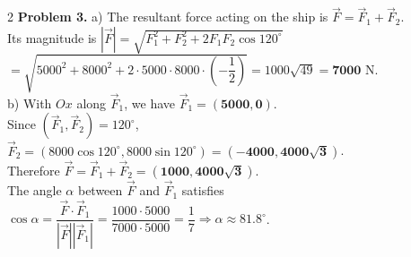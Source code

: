 \documentclass[10pt,a4paper]{article}
\begin{document}
\begin{multicols}{2}
\textbf{Problem 3.}
a) The resultant force acting on the ship is $\vec{F} = \vec{F}_1 + \vec{F}_2$.\\
Its magnitude is $|\vec{F}| = \sqrt{F_1^2 + F_2^2 + 2F_1 F_2 \cos 120^\circ}$\\
$= \sqrt{5000^2 + 8000^2 + 2\cdot 5000\cdot 8000\cdot \left(-\dfrac{1}{2}\right)} = 1000\sqrt{49} = \mathbf{7000}\text{ N}$.\\
b) With $Ox$ along $\vec{F}_1$, we have $\vec{F}_1 = (\mathbf{5000}, \mathbf{0})$.\\
Since $(\vec{F}_1, \vec{F}_2) = 120^\circ$, $\vec{F}_2 = (8000\cos 120^\circ, 8000\sin 120^\circ) = (\mathbf{-4000}, \mathbf{4000\sqrt{3}})$.\\
Therefore $\vec{F} = \vec{F}_1 + \vec{F}_2 = (\mathbf{1000}, \mathbf{4000\sqrt{3}})$.\\
The angle $\alpha$ between $\vec{F}$ and $\vec{F}_1$ satisfies $\cos\alpha = \dfrac{\vec{F} \cdot \vec{F}_1}{|\vec{F}||\vec{F}_1|} = \dfrac{1000 \cdot 5000}{7000 \cdot 5000} = \dfrac{1}{7} \Rightarrow \alpha \approx \mathbf{81.8}^\circ$.

\end{multicols}
\end{document}
